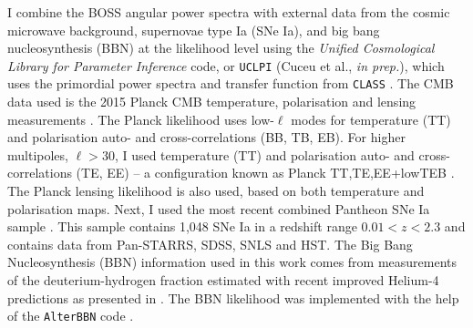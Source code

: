 \qquad I combine the BOSS angular power spectra with external data from the cosmic microwave background, supernovae type Ia (SNe Ia), and big bang nucleosynthesis (BBN) at the likelihood level using the \textit{Unified Cosmological Library for Parameter Inference} code, or \texttt{UCLPI} (Cuceu et al., \textit{in prep.}), which uses the primordial power spectra and transfer function from \texttt{CLASS} \citep{Class}. The CMB data used is the 2015 Planck CMB temperature, polarisation and lensing measurements \citep{PlanckLikelihood2015}. The Planck likelihood uses low-$\ell$ modes for temperature (TT) and polarisation auto- and cross-correlations (BB, TB, EB). For higher multipoles, $\ell > 30$, I used temperature (TT) and polarisation auto- and cross-correlations (TE, EE) -- a configuration known as Planck TT,TE,EE+lowTEB \citep{PlanckLikelihood2015,PlanckResults2015}. The Planck lensing likelihood is also used, based on both temperature and polarisation maps. Next, I used  the most recent combined Pantheon SNe Ia sample \citep{2018Pantheon}. This sample contains 1,048 SNe Ia in a redshift range $0.01 < z < 2.3$ and contains data from Pan-STARRS, SDSS, SNLS and HST. The Big Bang Nucleosynthesis (BBN) information used in this work comes from measurements of the deuterium-hydrogen fraction estimated with recent improved Helium-4 predictions as presented in \cite{2018BBN-Measurements}. The BBN likelihood was implemented with the help of the \texttt{AlterBBN} code \citep{2018AlterBBN}. 



